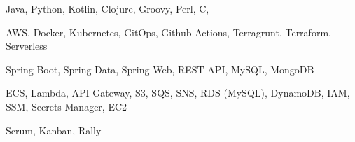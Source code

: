 
\begin{cvskills}

    {Java, Python, Kotlin, Clojure, Groovy, Perl, C, \CC{}} %

    {AWS, Docker, Kubernetes, GitOps, Github Actions, Terragrunt, Terraform, Serverless} %

    {Spring Boot, Spring Data, Spring Web, REST API, MySQL, MongoDB} %

    {ECS, Lambda, API Gateway, S3, SQS, SNS, RDS (MySQL), DynamoDB, IAM, SSM, Secrets Manager, EC2}

    {Scrum, Kanban, Rally} %

\end{cvskills}
